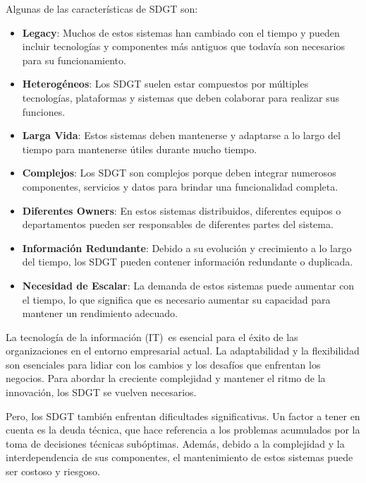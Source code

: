 \documentclass{article}
\begin{document}
			Algunas de las características de SDGT son: 
			\begin{itemize}		
				\item \textbf{Legacy}: Muchos de estos sistemas han cambiado con el tiempo y pueden incluir tecnologías y componentes más antiguos que todavía son necesarios para su funcionamiento.
				
				\item \textbf{Heterogéneos}: Los SDGT suelen estar compuestos por múltiples tecnologías, plataformas y sistemas que deben colaborar para realizar sus funciones.
				
				\item \textbf{Larga Vida}: Estos sistemas deben mantenerse y adaptarse a lo largo del tiempo para mantenerse útiles durante mucho tiempo.
				
				
				\item \textbf{Complejos}: Los SDGT son complejos porque deben integrar numerosos componentes, servicios y datos para brindar una funcionalidad completa.
				
				\item \textbf{Diferentes Owners}: En estos sistemas distribuidos, diferentes equipos o departamentos pueden ser responsables de diferentes partes del sistema.
				
				\item \textbf{Información Redundante}: Debido a su evolución y crecimiento a lo largo del tiempo, los SDGT pueden contener información redundante o duplicada.
				
				\item \textbf{Necesidad de Escalar}: La demanda de estos sistemas puede aumentar con el tiempo, lo que significa que es necesario aumentar su capacidad para mantener un rendimiento adecuado.
				
			\end{itemize}
		
		La tecnología de la información (IT) es esencial para el éxito de las organizaciones en el entorno empresarial actual. La adaptabilidad y la flexibilidad son esenciales para lidiar con los cambios y los desafíos que enfrentan los negocios. Para abordar la creciente complejidad y mantener el ritmo de la innovación, los SDGT se vuelven necesarios.
		
		Pero, los SDGT también enfrentan dificultades significativas. Un factor a tener en cuenta es la deuda técnica, que hace referencia a los problemas acumulados por la toma de decisiones técnicas subóptimas. Además, debido a la complejidad y la interdependencia de sus componentes, el mantenimiento de estos sistemas puede ser costoso y riesgoso.
		
\end{document}
